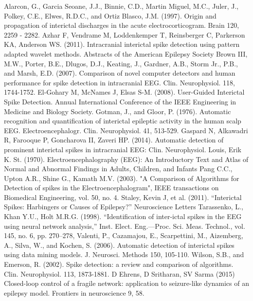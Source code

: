 \documentclass[letterpaper, 10pt, conference]{ieeeconf}      %
\begin{document}
\begin{thebibliography}{99}

  Alarcon, G., Garcia Seoane, J.J., Binnie, C.D., Martin Miguel, M.C., Juler, J., Polkey, C.E., Elwes, R.D.C., and Ortiz Blasco, J.M. (1997). Origin and propagation of interictal discharges in the acute electrocorticogram. Brain 120, 2259 - 2282.
	Azhar F, Vendrame M, Loddenkemper T, Reinsberger C, Parkerson KA, Anderson WS. (2011). Intracranial interictal spike detection using pattern adapted wavelet methods. Abstracts of the American Epilepsy Society
  Brown III, M.W., Porter, B.E., Dlugos, D.J., Keating, J., Gardner, A.B., Storm Jr., P.B., and Marsh, E.D. (2007). Comparison of novel computer detectors and human performance for spike detection in intracranial EEG. Clin. Neurophysiol. 118, 1744-1752.
  El-Gohary M, McNames J, Elsas S-M. (2008). User-Guided Interictal Spike Detection. Annual International Conference of the IEEE Engineering in Medicine and Biology Society.
  Gotman, J., and Gloor, P. (1976). Automatic recognition and quantification of interictal epileptic activity in the human scalp EEG. Electroencephalogr. Clin. Neurophysiol. 41, 513-529.
 Gaspard N, Alkawadri R, Farooque P, Goncharova II, Zaveri HP. (2014). Automatic detection of prominent interictal spikes in intracranial EEG: Clin. Neurophysiol.
 Louis, Erik K. St. (1970). Electroencephalography (EEG): An Introductory Text and Atlas of Normal and Abnormal Findings in Adults, Children, and Infants
 Pang C.C., Upton A.R., Shine G., Kamath M.V. (2003). "A Comparison of Algorithms for Detection of spikes in the Electroencephalogram", IEEE transactions on Biomedical Engineering, vol. 50, no. 4.
 Staley, Kevin J, et al. (2011). “Interictal Spikes: Harbingers or Causes of Epilepsy?” Neuroscience Letters
 Tarassenko, L., Khan Y.U., Holt M.R.G. (1998). “Identification of
inter-ictal spikes in the EEG using neural network analysis,” Inst. Elect.
Eng.—Proc. Sci. Meas. Technol., vol. 145, no. 6, pp. 270–278,
 Valenti, P., Cazamajou, E., Scarpettini, M., Aizemberg, A., Silva, W., and Kochen, S. (2006). Automatic detection of interictal spikes using data mining models. J. Neurosci. Methods 150, 105-110.
  Wilson, S.B., and Emerson, R. (2002). Spike detection: a review and comparison of algorithms. Clin. Neurophysiol. 113, 1873-1881.
D Ehrens, D Sritharan, SV Sarma (2015) Closed-loop control of a fragile network: application to seizure-like dynamics of an epilepsy model. Frontiers in neuroscience 9, 58.

\end{thebibliography}
\addtolength{\textheight}{-3cm}   %
\end{document}
